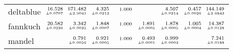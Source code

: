 \documentclass[a4paper,UKenglish]{lipics-v2016}
\begin{document}
\begin{table*}[t]
\begin{adjustbox}{width=1.2\textwidth,center}
\begin{tabular}{lrrrrrrrr}
deltablue&$\substack{\mathmakebox[.7cm][r]{16.528}\\{\mathmakebox[.7cm][r]{\scriptscriptstyle \pm 0.0707}}}$&$\substack{\mathmakebox[.7cm][r]{671.482}\\{\mathmakebox[.7cm][r]{\scriptscriptstyle \pm 2.9041}}}$&$\substack{\mathmakebox[.7cm][r]{4.325}\\{\mathmakebox[.7cm][r]{\scriptscriptstyle \pm 0.0212}}}$&$\substack{\mathmakebox[.7cm][r]{1.000}\\{\mathmakebox[.7cm][r]{\scriptscriptstyle }}}$&&$\substack{\mathmakebox[.7cm][r]{4.507}\\{\mathmakebox[.7cm][r]{\scriptscriptstyle \pm 0.0214}}}$&$\substack{\mathmakebox[.7cm][r]{0.457}\\{\mathmakebox[.7cm][r]{\scriptscriptstyle \pm 0.0026}}}$&$\substack{\mathmakebox[.7cm][r]{144.149}\\{\mathmakebox[.7cm][r]{\scriptscriptstyle \pm 2.6843}}}$\\
\addlinespace
fannkuch&$\substack{\mathmakebox[.7cm][r]{20.582}\\{\mathmakebox[.7cm][r]{\scriptscriptstyle \pm 0.0226}}}$&$\substack{\mathmakebox[.7cm][r]{3.342}\\{\mathmakebox[.7cm][r]{\scriptscriptstyle \pm 0.0025}}}$&$\substack{\mathmakebox[.7cm][r]{1.848}\\{\mathmakebox[.7cm][r]{\scriptscriptstyle \pm 0.0007}}}$&$\substack{\mathmakebox[.7cm][r]{1.000}\\{\mathmakebox[.7cm][r]{\scriptscriptstyle }}}$&$\substack{\mathmakebox[.7cm][r]{1.891}\\{\mathmakebox[.7cm][r]{\scriptscriptstyle \pm 0.0005}}}$&$\substack{\mathmakebox[.7cm][r]{1.878}\\{\mathmakebox[.7cm][r]{\scriptscriptstyle \pm 0.0005}}}$&$\substack{\mathmakebox[.7cm][r]{1.005}\\{\mathmakebox[.7cm][r]{\scriptscriptstyle \pm 0.0004}}}$&$\substack{\mathmakebox[.7cm][r]{14.387}\\{\mathmakebox[.7cm][r]{\scriptscriptstyle \pm 0.0128}}}$\\
\addlinespace
mandel&&$\substack{\mathmakebox[.7cm][r]{0.791}\\{\mathmakebox[.7cm][r]{\scriptscriptstyle \pm 0.0056}}}$&$\substack{\mathmakebox[.7cm][r]{0.921}\\{\mathmakebox[.7cm][r]{\scriptscriptstyle \pm 0.0005}}}$&$\substack{\mathmakebox[.7cm][r]{1.000}\\{\mathmakebox[.7cm][r]{\scriptscriptstyle }}}$&$\substack{\mathmakebox[.7cm][r]{0.493}\\{\mathmakebox[.7cm][r]{\scriptscriptstyle \pm 0.0001}}}$&$\substack{\mathmakebox[.7cm][r]{0.999}\\{\mathmakebox[.7cm][r]{\scriptscriptstyle \pm 0.0003}}}$&&$\substack{\mathmakebox[.7cm][r]{7.241}\\{\mathmakebox[.7cm][r]{\scriptscriptstyle \pm 0.0188}}}$\\

\end{tabular}
\end{adjustbox}
\end{table*}
\end{document}

